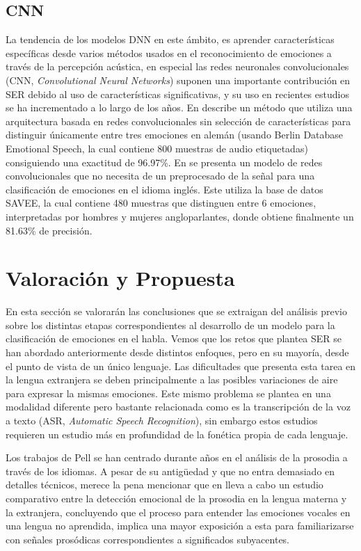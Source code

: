 \documentclass[11pt,a4paper,spanish]{book}
\begin{document}
	\subsection{CNN}
	La tendencia de los modelos DNN en este ámbito, es aprender características específicas desde varios métodos usados en el reconocimiento de emociones a través de la percepción acústica, en especial las redes neuronales convolucionales (CNN, \emph{Convolutional Neural Networks}) suponen una importante contribución en SER debido al uso de características significativas, y su uso en recientes estudios se ha incrementado a lo largo de los años.
	En \cite{Harar2017} describe un método que utiliza una arquitectura basada en redes convolucionales sin selección de características para distinguir únicamente entre tres emociones en alemán (usando Berlin Database Emotional Speech, la cual contiene 800 muestras de audio etiquetadas) consiguiendo una exactitud de 96.97\%. En \cite{AbdulQayyum2019} se presenta un modelo de redes convolucionales que no necesita de un preprocesado de la señal para una clasificación de emociones en el idioma inglés. Este utiliza la base de datos SAVEE, la cual contiene 480 muestras que distinguen entre 6 emociones, interpretadas por hombres y mujeres angloparlantes, donde obtiene finalmente un 81.63\% de precisión.
	

	\section{Valoración y Propuesta}
	En esta sección se valorarán las conclusiones que se extraigan del análisis previo sobre los distintas etapas correspondientes al desarrollo de un modelo para la clasificación de emociones en el habla. Vemos que los retos que plantea SER se han abordado anteriormente desde distintos enfoques, pero en su mayoría, desde el punto de vista de un único lenguaje. Las dificultades que presenta esta tarea en la lengua extranjera se deben principalmente a las posibles variaciones de aire para expresar la mismas emociones. Este mismo problema se plantea en una modalidad diferente pero bastante relacionada como es la transcripción de la voz a texto (ASR, \emph{Automatic Speech Recognition}), sin embargo estos estudios requieren un estudio más en profundidad de la fonética propia de cada lenguaje.
	
	Los trabajos de Pell se han centrado durante años en el análisis de la prosodia a través de los idiomas. A pesar de su antigüedad y que no entra demasiado en detalles técnicos, merece la pena mencionar que en \cite{Pell2008} lleva a cabo un estudio comparativo entre la detección emocional de la prosodia en la lengua materna y la extranjera, concluyendo que el proceso para entender las emociones vocales en una lengua no aprendida, implica una mayor exposición a esta para familiarizarse con señales prosódicas correspondientes a significados subyacentes.
	
\end{document}
